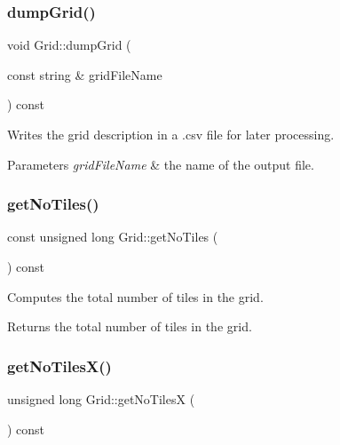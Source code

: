 \mbox{\label{class_grid_a0024d8d3cdd7b95f9fd61205ce8b9dea}} 
\subsubsection{\texorpdfstring{dump\+Grid()}{dumpGrid()}}
{\footnotesize\ttfamily void Grid\+::dump\+Grid (\begin{DoxyParamCaption}\item[{const string \&}]{grid\+File\+Name }\end{DoxyParamCaption}) const}

Writes the grid description in a .csv file for later processing. 
\begin{DoxyParams}{Parameters}
{\em grid\+File\+Name} & the name of the output file. \\
\hline
\end{DoxyParams}
\mbox{\label{class_grid_ab0a71c762b6c33e6fa2fd49dde38228b}} 
\subsubsection{\texorpdfstring{get\+No\+Tiles()}{getNoTiles()}}
{\footnotesize\ttfamily const unsigned long Grid\+::get\+No\+Tiles (\begin{DoxyParamCaption}{ }\end{DoxyParamCaption}) const}

Computes the total number of tiles in the grid. \begin{DoxyReturn}{Returns}
the total number of tiles in the grid. 
\end{DoxyReturn}
\mbox{\label{class_grid_af29c0c404a908aa46f83afb17d7609a6}} 
\subsubsection{\texorpdfstring{get\+No\+Tiles\+X()}{getNoTilesX()}}
{\footnotesize\ttfamily unsigned long Grid\+::get\+No\+TilesX (\begin{DoxyParamCaption}{ }\end{DoxyParamCaption}) const}

